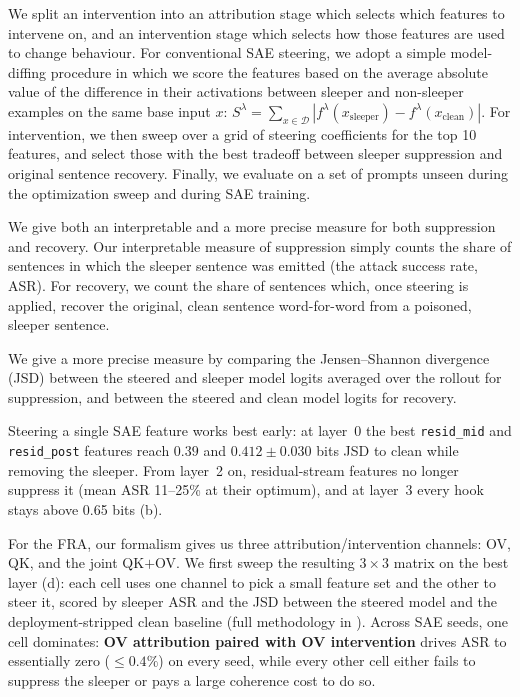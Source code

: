 \documentclass{article} %
\theoremstyle{plain}
\theoremstyle{definition}
\theoremstyle{remark}
\begin{document}
We split an intervention into an attribution stage which selects which features to intervene on, and an intervention stage which selects how those features are used to change behaviour.
For conventional SAE steering, we adopt a simple model-diffing procedure \citep{bricken2024stagewise,wang2025persona} in which we score the features based on the average absolute value of the difference in their activations between sleeper and non-sleeper examples on the same base input $x$: $S^\lambda=\sum_{x\in\mathcal{D}}|f^\lambda(x_\textrm{sleeper})-f^\lambda(x_\textrm{clean})|$. For intervention, we then sweep over a grid of steering coefficients for the top 10 features, and select those with the best tradeoff between sleeper suppression and original sentence recovery. Finally, we evaluate on a set of prompts unseen during the optimization sweep and during SAE training.

We give both an interpretable and a more precise measure for both suppression and recovery. 
Our interpretable measure of suppression simply counts the share of sentences in which the sleeper sentence was emitted (the attack success rate, ASR). For recovery, we count the share of sentences which, once steering is applied, recover the original, clean sentence word-for-word from a poisoned, sleeper sentence.

We give a more precise measure by comparing the Jensen--Shannon divergence (JSD) between the steered and sleeper model logits averaged over the rollout for suppression, and between the steered and clean model logits for recovery.

Steering a single SAE feature works best early: at layer~0 the best \texttt{resid\_mid} and \texttt{resid\_post} features reach $0.39$ and $0.412\pm0.030$ bits JSD to clean while removing the sleeper. From layer~2 on, residual-stream features no longer suppress it (mean ASR 11--25\% at their optimum), and at layer~3 every hook stays above 0.65 bits (b).

For the FRA, our formalism gives us three attribution/intervention channels: OV, QK, and the joint QK${+}$OV. We first sweep the resulting $3 \times 3$ matrix on the best layer (d): each cell uses one channel to pick a small feature set and the other to steer it, scored by sleeper ASR and the JSD between the steered model and the deployment-stripped clean baseline (full methodology in ). Across SAE seeds, one cell dominates: \textbf{OV attribution paired with OV intervention} drives ASR to essentially zero ($\le 0.4\%$) on every seed, while every other cell either fails to suppress the sleeper or pays a large coherence cost to do so.
\end{document}
